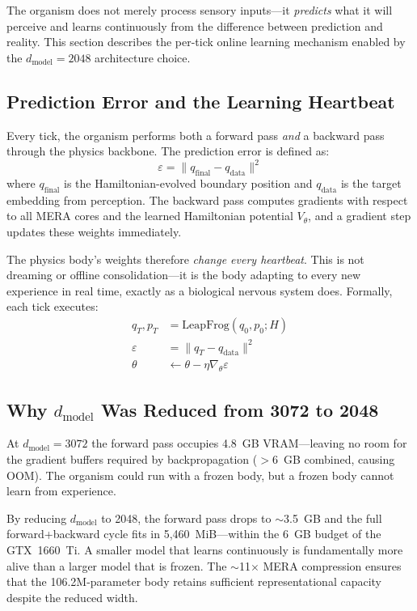 \documentclass[11pt,a4paper,twocolumn]{article}
\begin{document}
The organism does not merely process sensory inputs---it \emph{predicts} what it will perceive and learns continuously from the difference between prediction and reality.
This section describes the per-tick online learning mechanism enabled by the $d_{\mathrm{model}}=2048$ architecture choice.

\subsection{Prediction Error and the Learning Heartbeat}

Every tick, the organism performs both a forward pass \emph{and} a backward pass through the physics backbone.
The prediction error is defined as:
\begin{equation}
\varepsilon = \|q_{\mathrm{final}} - q_{\mathrm{data}}\|^2
\label{eq:pred_error}
\end{equation}
where $q_{\mathrm{final}}$ is the Hamiltonian-evolved boundary position and $q_{\mathrm{data}}$ is the target embedding from perception.
The backward pass computes gradients with respect to all MERA cores and the learned Hamiltonian potential $V_\theta$, and a gradient step updates these weights immediately.

The physics body's weights therefore \emph{change every heartbeat}.
This is not dreaming or offline consolidation---it is the body adapting to every new experience in real time, exactly as a biological nervous system does.
Formally, each tick executes:
\begin{align}
q_T, p_T &= \mathrm{LeapFrog}(q_0, p_0; H) \label{eq:ptl_forward} \\
\varepsilon &= \|q_T - q_{\mathrm{data}}\|^2 \label{eq:ptl_error} \\
\theta &\leftarrow \theta - \eta \nabla_\theta \varepsilon \label{eq:ptl_update}
\end{align}

\subsection{Why \texorpdfstring{$d_{\mathrm{model}}$}{d\_model} Was Reduced from 3072 to 2048}

At $d_{\mathrm{model}}=3072$ the forward pass occupies 4.8~GB VRAM---leaving no room for the gradient buffers required by backpropagation ($>$6~GB combined, causing OOM).
The organism could run with a frozen body, but a frozen body cannot learn from experience.

By reducing $d_{\mathrm{model}}$ to 2048, the forward pass drops to $\sim$3.5~GB and the full forward+backward cycle fits in 5{,}460~MiB---within the 6~GB budget of the GTX~1660~Ti.
A smaller model that learns continuously is fundamentally more alive than a larger model that is frozen.
The $\sim$11$\times$ MERA compression ensures that the 106.2M-parameter body retains sufficient representational capacity despite the reduced width.
\end{document}
